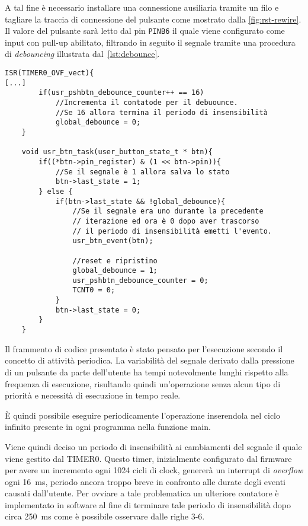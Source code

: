 A tal fine è necessario installare una connessione ausiliaria tramite un filo e tagliare la traccia di connessione del pulsante come mostrato dalla \cref{fig:rst-rewire}. Il valore del pulsante sarà letto dal pin \texttt{PINB6} il quale viene configurato come input con pull-up abilitato, filtrando in seguito il segnale tramite una procedura di \textit{debouncing} illustrata dal~\cref{lst:debounce}.

\noindent\begin{minipage}{\textwidth}
    \begin{lstlisting}[style=C, caption={Routine di interrupt di TIMER0 per la gestione del debounce}, label=lst:debounce]
    ISR(TIMER0_OVF_vect){
[...]
        if(usr_pshbtn_debounce_counter++ == 16) 
            //Incrementa il contatode per il debuounce.
            //Se 16 allora termina il periodo di insensibilità
            global_debounce = 0;
    }

    void usr_btn_task(user_button_state_t * btn){
        if((*btn->pin_register) & (1 << btn->pin)){
            //Se il segnale è 1 allora salva lo stato
            btn->last_state = 1; 
        } else {
            if(btn->last_state && !global_debounce){
                //Se il segnale era uno durante la precedente 
                // iterazione ed ora è 0 dopo aver trascorso 
                // il periodo di insensibilità emetti l'evento.
                usr_btn_event(btn);

                //reset e ripristino
                global_debounce = 1;
                usr_pshbtn_debounce_counter = 0;
                TCNT0 = 0;
            }
            btn->last_state = 0;
        }
    }
    \end{lstlisting}
\end{minipage}

Il frammento di codice presentato è stato pensato per l'esecuzione secondo il concetto di attività periodica. La variabilità del segnale derivato dalla pressione di un pulsante da parte dell'utente ha tempi notevolmente lunghi rispetto alla frequenza di esecuzione, risultando quindi un'operazione senza alcun tipo di priorità e necessità di esecuzione in tempo reale.

È quindi possibile eseguire periodicamente l'operazione inserendola nel ciclo infinito presente in ogni programma nella funzione main.

Viene quindi deciso un periodo di insensibilità ai cambiamenti del segnale il quale viene gestito dal TIMER0. Questo timer, inizialmente configurato dal firmware per avere un incremento ogni 1024 cicli di clock, genererà un interrupt di \textit{overflow} ogni \SI{16}{\milli\second}, periodo ancora troppo breve in confronto alle durate degli eventi causati dall'utente. Per ovviare a tale problematica un ulteriore contatore è implementato in software al fine di terminare tale periodo di insensibilità dopo circa \SI{250}{\milli\second} come è possibile osservare dalle righe 3-6.\@


